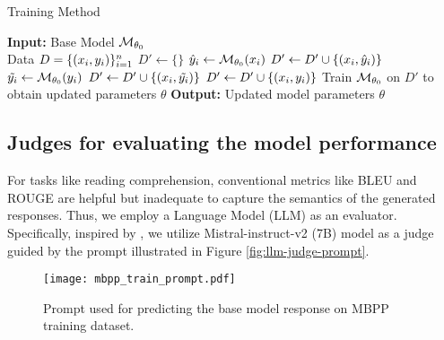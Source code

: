 \begin{algorithm}
\caption{Training Method}
\begin{algorithmic}[1]
\STATE \textbf{Input:} Base Model $\mathcal{M}_{\theta_0}$ \\
Data $D = \{(x_i, y_i)\}_{i=1}^{n}$
\STATE $D' \gets \{\}$
    \STATE $\hat{y}_i \gets \mathcal{M}_{\theta_0}(x_i)$
        \STATE $D' \gets D' \cup \{(x_i, \hat{y}_i)\}$
    \ELSE
        \STATE $\tilde{y_i}  \gets \mathcal{M}_{\theta_0}(y_i)$
            \STATE $D' \gets D' \cup \{(x_i, \tilde{y_i})\}$
        \ELSE
            \STATE $D' \gets D' \cup \{(x_i, y_i)\}$
        \ENDIF
    \ENDIF
\ENDFOR
\STATE Train $\mathcal{M}_{\theta_0}$ on $D'$ to obtain updated parameters $\theta$
\STATE \textbf{Output:} Updated model parameters $\theta$
\end{algorithmic}
\end{algorithm}

\subsection{Judges for evaluating the model performance}
\label{app:llm-judge}
For tasks like reading comprehension, conventional metrics like BLEU and ROUGE are helpful but inadequate to capture the semantics of the generated responses. Thus, we employ a Language Model (LLM) as an evaluator. Specifically, inspired by \cite{badshah2408reference}, we utilize Mistral-instruct-v2 (7B) model as a judge guided by the prompt illustrated in Figure \ref{fig:llm-judge-prompt}.

\begin{figure}
    \centering
    \texttt{[image: mbpp\_train\_prompt.pdf]}
    \caption{Prompt used for predicting the base model response on MBPP training dataset.}
    \label{fig:mbpp_predict}
\end{figure}
